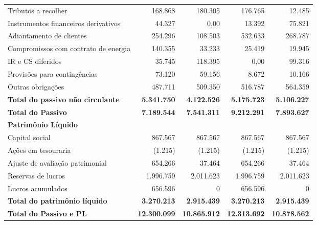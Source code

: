\documentclass[1pt,a4paper]{article}
\begin{document}
\begin{longtable}{p{6cm} r r r r}
			Tributos a recolher & 168.868 & 180.305 & 176.765 & 12.485 \\
			Instrumentos financeiros derivativos & 44.327 & 0,00 & 13.392 & 75.821 \\
			Adiantamento de clientes & 254.296 & 108.503 & 532.633 & 268.787 \\
			Compromissos com contrato de energia & 140.355 & 33.233 & 25.419 & 19.945 \\
			IR e CS diferidos & 35.745 & 118.395 & 0,00 & 99.316 \\
			Provisões para contingências & 73.120 & 59.156 & 8.672 & 10.166 \\
			Outras obrigações & 487.711 & 509.350 & 516.787 & 564.359 \\
			\rowcolor{darkgray}\textbf{Total do passivo não circulante} & \textbf{5.341.750} & \textbf{4.122.526} & \textbf{5.175.723} & \textbf{5.106.227} \\
			\midrule
			\rowcolor{darkgray}\textbf{Total do Passivo} & \textbf{7.189.544} & \textbf{7.541.311} & \textbf{9.212.291} & \textbf{7.893.627} \\
			\midrule
			
			\textbf{Patrimônio Líquido} & & & & \\
			Capital social & 867.567 & 867.567 & 867.567 & 867.567 \\
			Ações em tesouraria & (1.215) & (1.215) & (1.215) & (1.215) \\
			Ajuste de avaliação patrimonial & 654.266 & 37.464 & 654.266 & 37.464 \\
			Reservas de lucros & 1.996.759 & 2.011.623 & 1.996.759 & 2.011.623 \\
			Lucros acumulados & 656.596 & 0 & 656.596 & 0 \\
			\rowcolor{darkgray}\textbf{Total do patrimônio líquido} & \textbf{3.270.213} & \textbf{2.915.439} & \textbf{3.270.213} & \textbf{2.915.439} \\
			\midrule
			\rowcolor{darkgray}\textbf{Total do Passivo e PL} & \textbf{12.300.099} & \textbf{10.865.912} & \textbf{12.313.692} & \textbf{10.878.562} \\
			\bottomrule
		\end{longtable}
		
	
	
\end{document}

